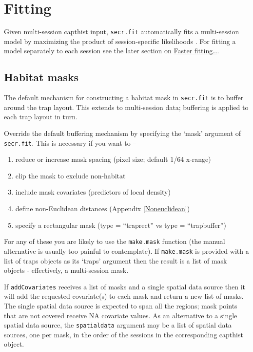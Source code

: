 \documentclass[
]{book}
\providecommand{\tightlist}{%
  \setlength{\itemsep}{0pt}\setlength{\parskip}{0pt}}
\begin{document}
\section{Fitting}\label{fitting}

Given multi-session capthist input, \texttt{secr.fit} automatically fits a multi-session model by maximizing the product of session-specific likelihoods \citep{ebb09}. For fitting a model separately to each session see the later section on \hyperref[fasterfitting]{Faster fitting\ldots{}}.

\subsection{Habitat masks}\label{habitat-masks}

The default mechanism for constructing a habitat mask in \texttt{secr.fit} is to buffer around the trap layout. This extends to multi-session data; buffering is applied to each trap layout in turn.

Override the default buffering mechanism by specifying the `mask' argument of \texttt{secr.fit}. This is necessary if you want to --

\begin{enumerate}
\def\labelenumi{\arabic{enumi}.}
\tightlist
\item
  reduce or increase mask spacing (pixel size; default 1/64 x-range)
\item
  clip the mask to exclude non-habitat
\item
  include mask covariates (predictors of local density)
\item
  define non-Euclidean distances (Appendix \ref{Noneuclidean})
\item
  specify a rectangular mask (type = ``traprect'' vs type = ``trapbuffer'')
\end{enumerate}

For any of these you are likely to use the \texttt{make.mask} function (the manual alternative is usually too painful to contemplate). If \texttt{make.mask} is provided with a list of traps objects as its `traps' argument then the result is a list of mask objects - effectively, a multi-session mask.

If \texttt{addCovariates} receives a list of masks and a single spatial data source then it will add the requested covariate(s) to each mask and return a new list of masks. The single spatial data source is expected to span all the regions; mask points that are not covered receive NA covariate values. As an alternative to a single spatial data source, the \texttt{spatialdata} argument may be a list of spatial data sources, one per mask, in the order of the sessions in the corresponding capthist object.
\end{document}

